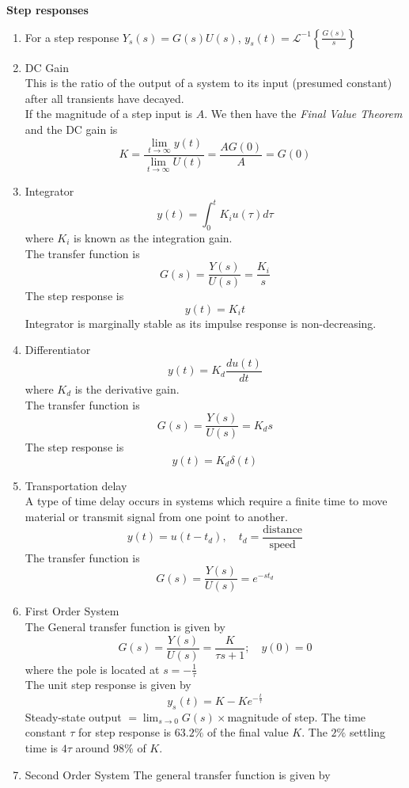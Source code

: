 \textbf{Step responses}
\begin{enumerate}
    \item For a step response $\displaystyle Y_s(s) = G(s)U(s)$, $\displaystyle y_s(t) = \mathscr{L}^{-1} \left\{ \frac{G(s)}{s} \right\}$
    \item DC Gain \\
    This is the ratio of the output of a system to its input (presumed constant) after all transients have decayed. \\
    If the magnitude of a step input is $A$. We then have the \textit{Final Value Theorem} and the DC gain is
     \[K = \frac{\displaystyle \lim_{ t \to \infty} y(t)}{\displaystyle \lim_{t \to \infty} U(t)} = \frac{AG(0)}{A} = G(0)\]
    \item Integrator 
    \[y(t) = \int_{0}^{t} K_i u(\tau) d\tau\]
    where $K_i$ is known as the integration gain.\\
    The transfer function is 
    \[G(s) = \frac{Y(s)}{U(s)} = \frac{K_i}{s}\]
    The step response is 
    \[y(t) = K_i t\]
    Integrator is marginally stable as its impulse response is non-decreasing. 
    \item Differentiator 
    \[y(t) = K_d \frac{du(t)}{dt}\]
    where $K_d$ is the derivative gain. \\
    The transfer function is 
    \[G(s) = \frac{Y(s)}{U(s)} = K_ds\]
    The step response is 
    \[y(t) = K_d \delta(t)\]
    \item Transportation delay \\
    A type of time delay occurs in systems which require a finite time to move material or transmit signal from one point to another.
    \[y(t) = u(t-t_d), \quad t_d = \frac{\text{distance}}{\text{speed}}\]
    The transfer function is 
    \[G(s) = \frac{Y(s)}{U(s)} = e^{-st_d}\]
    \item First Order System \\
    The General transfer function is given by
    \[G(s) = \frac{Y(s)}{U(s)} = \frac{K}{\tau s+1}; \quad y(0)= 0\]
    where the pole is located at $\displaystyle s =- \frac{1}{\tau}$ \\
    The unit step response is given by
    \[y_s(t) = K - Ke^{-\frac{t}{\tau}}\]
    Steady-state output $= \lim_{s\rightarrow0}G(s) \times $magnitude of step.
    The time constant $\tau$ for step response is $63.2\%$ of the final value $K$. The $2\%$ settling time is $4\tau$ around $98\%$ of $K$.
    \item Second Order System
    The general transfer function is given by

\end{enumerate}
